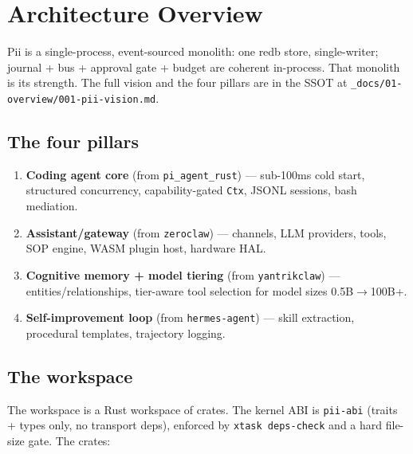 \documentclass[
	fontsize=10pt,
	twoside=false,
	secnumdepth=2,
	open=any,
]{kaobook}
\begin{document}
\begingroup
\setlength{\textheight}{230\vscale}
\etocstandarddisplaystyle
\etocstandardlines
\tableofcontents
\endgroup

\mainmatter
{}

\chapter{Architecture Overview}
\label{chap:arch}

Pii is a single-process, event-sourced monolith: one redb store,
single-writer; journal + bus + approval gate + budget are coherent
in-process. That monolith is its strength. The full vision and the four
pillars are in the SSOT at
\texttt{\_docs/01-overview/001-pii-vision.md}.

\section{The four pillars}

\begin{enumerate}
    \item \textbf{Coding agent core} (from \texttt{pi\_agent\_rust}) —
        sub-100ms cold start, structured concurrency, capability-gated
        \texttt{Ctx}, JSONL sessions, bash mediation.
    \item \textbf{Assistant/gateway} (from \texttt{zeroclaw}) — channels,
        LLM providers, tools, SOP engine, WASM plugin host, hardware HAL.
    \item \textbf{Cognitive memory + model tiering} (from
        \texttt{yantrikclaw}) — entities/relationships, tier-aware tool
        selection for model sizes 0.5B$\rightarrow$100B+.
    \item \textbf{Self-improvement loop} (from \texttt{hermes-agent}) —
        skill extraction, procedural templates, trajectory logging.
\end{enumerate}

\section{The workspace}

The workspace is a Rust workspace of crates. The kernel ABI is
\texttt{pii-abi} (traits + types only, no transport deps), enforced by
\texttt{xtask deps-check} and a hard file-size gate. The crates:
\end{document}
